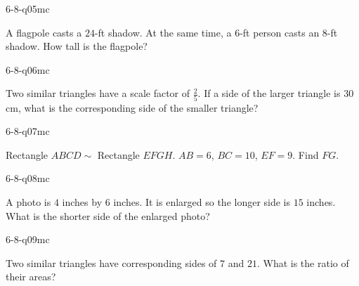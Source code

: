 \begin{practiceQuestion}{6-8-q05}{mc}
\begin{questionText}
A flagpole casts a $24$-ft shadow. At the same time, a $6$-ft person casts an $8$-ft shadow. How tall is the flagpole?
\end{questionText}
\end{practiceQuestion}

\begin{practiceQuestion}{6-8-q06}{mc}
\begin{questionText}
Two similar triangles have a scale factor of $\frac{2}{5}$. If a side of the larger triangle is $30$ cm, what is the corresponding side of the smaller triangle?
\end{questionText}
\end{practiceQuestion}

\begin{practiceQuestion}{6-8-q07}{mc}
\begin{questionText}
Rectangle $ABCD \sim$ Rectangle $EFGH$. $AB = 6$, $BC = 10$, $EF = 9$. Find $FG$.
\end{questionText}
\end{practiceQuestion}

\begin{practiceQuestion}{6-8-q08}{mc}
\begin{questionText}
A photo is $4$ inches by $6$ inches. It is enlarged so the longer side is $15$ inches. What is the shorter side of the enlarged photo?
\end{questionText}
\end{practiceQuestion}

\begin{practiceQuestion}{6-8-q09}{mc}
\begin{questionText}
Two similar triangles have corresponding sides of $7$ and $21$. What is the ratio of their areas?
\end{questionText}
\end{practiceQuestion}

